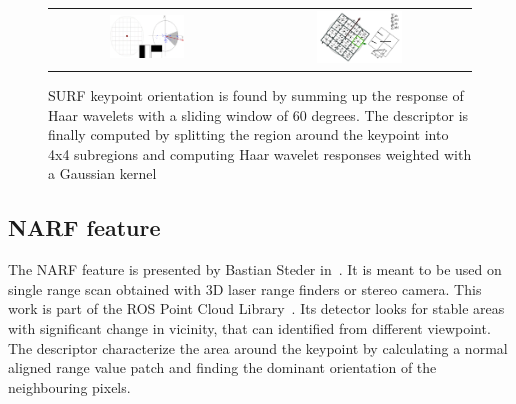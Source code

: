 \begin{figure}[H]
\centering
\begin{tabular}{cc}
\includegraphics[width=0.4\textwidth]{figures/surf_orientation} &
\includegraphics[width=0.4\textwidth]{figures/surf_descriptor}
\end{tabular}
\caption{SURF keypoint orientation is found by summing up the response of Haar wavelets with a sliding window of 60 degrees. The descriptor is finally computed by splitting the region around the keypoint into 4x4 subregions and computing Haar wavelet responses weighted with a Gaussian kernel}
\end{figure}

\subsection{NARF feature}

The NARF feature is presented by Bastian Steder in~\cite{steder10irosws}. It is meant to be used on single range scan obtained with 3D laser range finders or stereo camera. This work is part of the ROS Point Cloud Library~\cite{Rusu_ICRA2011_PCL}. Its detector looks for stable areas with significant change in vicinity, that can identified from different viewpoint. The descriptor characterize the area around the keypoint by calculating a normal aligned range value patch and finding the dominant orientation of the neighbouring pixels.

